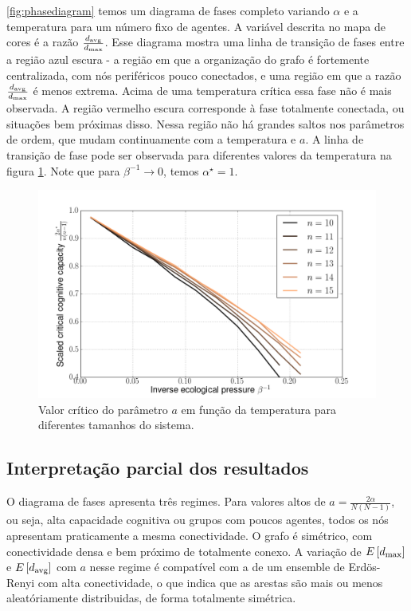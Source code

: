 \ref{fig:phasediagram} temos um diagrama de fases completo variando $\alpha$ e a temperatura para um número fixo de agentes. A variável descrita no mapa de cores é a razão $\frac{d_{\text{avg}}}{d_{\text{max}}}$. Esse diagrama mostra uma linha de transição de fases entre a região azul escura - a região em que a organização do grafo é fortemente centralizada, com nós periféricos pouco conectados, e uma região em que a razão $\frac{d_{\text{avg}}}{d_{\text{max}}}$ é menos extrema. Acima de uma temperatura crítica essa fase não é mais observada. A região vermelho escura corresponde à fase totalmente conectada, ou situações bem próximas disso. Nessa região não há grandes saltos nos parâmetros de ordem, que mudam continuamente com a temperatura e $a$. A linha de transição de fase pode ser observada para diferentes valores da temperatura na figura \ref{fig:critical}. Note que para $\beta^{-1} \to 0$, temos $\alpha^{\star} = 1$.
\begin{figure}
	\includegraphics[width = 1.15\textwidth]{figuras/critical.png}
 	\caption{Valor crítico do parâmetro $a$ em função da temperatura para diferentes tamanhos do sistema.}
 	\label{fig:critical}
\end{figure}

\subsection{Interpretação parcial dos resultados}

O diagrama de fases apresenta três regimes. Para valores altos de $a = \frac{2\alpha}{N(N-1)}$, ou seja, alta capacidade cognitiva ou grupos com poucos agentes, todos os nós apresentam praticamente a mesma conectividade. O grafo é simétrico, com conectividade densa e bem próximo de totalmente conexo. A variação de $E\left[d_{\text{max}}\right]$ e $E\left[d_{\text{avg}}\right]$ com $a$ nesse regime é compatível com a de um ensemble de Erdös-Renyi com alta conectividade, o que indica que as arestas são mais ou menos aleatóriamente distribuidas, de forma totalmente simétrica.

